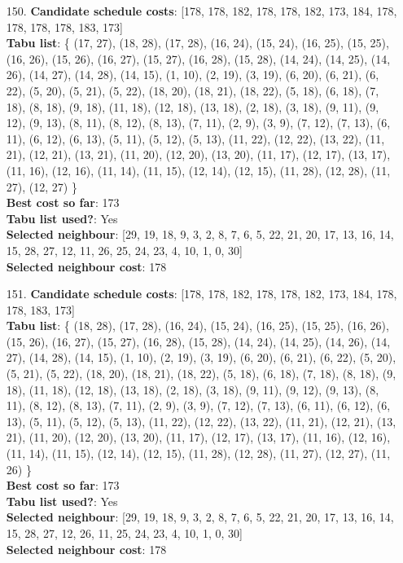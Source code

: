 \documentclass[fleqn]{article}
\begin{document}
\begin{itemize}
    \item[150.] \textbf{Candidate schedule costs}: [178, 178, 182, 178, 178, 182, 173, 184, 178, 178, 178, 178, 183, 173] \\
    \textbf{Tabu list}: \{ (17, 27), (18, 28), (17, 28), (16, 24), (15, 24), (16, 25), (15, 25), (16, 26), (15, 26), (16, 27), (15, 27), (16, 28), (15, 28), (14, 24), (14, 25), (14, 26), (14, 27), (14, 28), (14, 15), (1, 10), (2, 19), (3, 19), (6, 20), (6, 21), (6, 22), (5, 20), (5, 21), (5, 22), (18, 20), (18, 21), (18, 22), (5, 18), (6, 18), (7, 18), (8, 18), (9, 18), (11, 18), (12, 18), (13, 18), (2, 18), (3, 18), (9, 11), (9, 12), (9, 13), (8, 11), (8, 12), (8, 13), (7, 11), (2, 9), (3, 9), (7, 12), (7, 13), (6, 11), (6, 12), (6, 13), (5, 11), (5, 12), (5, 13), (11, 22), (12, 22), (13, 22), (11, 21), (12, 21), (13, 21), (11, 20), (12, 20), (13, 20), (11, 17), (12, 17), (13, 17), (11, 16), (12, 16), (11, 14), (11, 15), (12, 14), (12, 15), (11, 28), (12, 28), (11, 27), (12, 27) \} \\
    \textbf{Best cost so far}: 173 \\
    \textbf{Tabu list used?}: Yes \\
    \textbf{Selected neighbour}: [29, 19, 18, 9, 3, 2, 8, 7, 6, 5, 22, 21, 20, 17, 13, 16, 14, 15, 28, 27, 12, 11, 26, 25, 24, 23, 4, 10, 1, 0, 30] \\
    \textbf{Selected neighbour cost}: 178
      

    \item[151.] \textbf{Candidate schedule costs}: [178, 178, 182, 178, 178, 182, 173, 184, 178, 178, 183, 173] \\
    \textbf{Tabu list}: \{ (18, 28), (17, 28), (16, 24), (15, 24), (16, 25), (15, 25), (16, 26), (15, 26), (16, 27), (15, 27), (16, 28), (15, 28), (14, 24), (14, 25), (14, 26), (14, 27), (14, 28), (14, 15), (1, 10), (2, 19), (3, 19), (6, 20), (6, 21), (6, 22), (5, 20), (5, 21), (5, 22), (18, 20), (18, 21), (18, 22), (5, 18), (6, 18), (7, 18), (8, 18), (9, 18), (11, 18), (12, 18), (13, 18), (2, 18), (3, 18), (9, 11), (9, 12), (9, 13), (8, 11), (8, 12), (8, 13), (7, 11), (2, 9), (3, 9), (7, 12), (7, 13), (6, 11), (6, 12), (6, 13), (5, 11), (5, 12), (5, 13), (11, 22), (12, 22), (13, 22), (11, 21), (12, 21), (13, 21), (11, 20), (12, 20), (13, 20), (11, 17), (12, 17), (13, 17), (11, 16), (12, 16), (11, 14), (11, 15), (12, 14), (12, 15), (11, 28), (12, 28), (11, 27), (12, 27), (11, 26) \} \\
    \textbf{Best cost so far}: 173 \\
    \textbf{Tabu list used?}: Yes \\
    \textbf{Selected neighbour}: [29, 19, 18, 9, 3, 2, 8, 7, 6, 5, 22, 21, 20, 17, 13, 16, 14, 15, 28, 27, 12, 26, 11, 25, 24, 23, 4, 10, 1, 0, 30] \\
    \textbf{Selected neighbour cost}: 178
      


\end{itemize}
\end{document}
